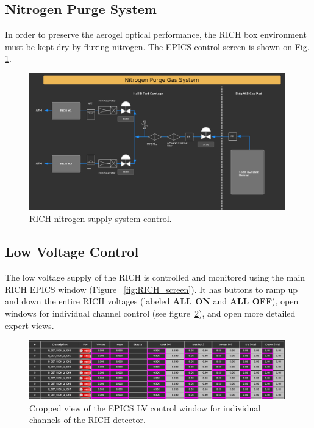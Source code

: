 \documentclass[12pt]{article}
\begin{document}
\subsection{Nitrogen Purge System}

In order to preserve the aerogel optical performance, the RICH box environment must be kept dry by fluxing nitrogen.
The EPICS control screen is shown on Fig. \ref{fig:N2_drawing}.


\begin{figure}[h!]
\center
\includegraphics[width=0.99\textwidth]{Justin_plots/N2Purge.PNG}
\caption{ \label{fig:N2_drawing} RICH  nitrogen supply system control.}
\end{figure}

\subsection{ Low Voltage Control}

The low voltage supply of the RICH is controlled and monitored using the main RICH
EPICS window (Figure ~\ref{fig:RICH_screen}). It has buttons to ramp up and down the entire 
RICH voltages (labeled {\bf ALL ON} and {\bf ALL OFF}), open windows for
individual channel control (see  figure~\ref{LVControl}), and open more detailed expert views.

\begin{figure}[htbp]
\center
\includegraphics[width=0.99\textwidth]{Justin_plots/LVallChannels.png}
\caption{ \label{LVControl} Cropped view of the EPICS LV control window for individual channels of the RICH detector.}
\end{figure}
\end{document}
